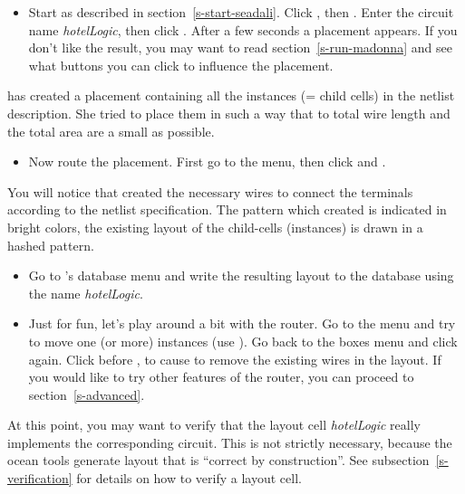\begin{itemize}
\item
Start  as described in section~\ref{s-start-seadali}.  Click
, then . 
Enter the circuit name {\sl
hotelLogic}, then click . After a few seconds a placement
appears. If you don't like the result, you may want to read
section~\ref{s-run-madonna} and see what buttons you can click to influence the
placement.
\end{itemize}
 has created a placement containing all the instances (= child
cells) 
in the netlist description. She tried to place them in such a way that
to total wire length and the total area are a small as possible.

\begin{itemize}
\item
Now route the placement. First go to the  menu, then click
and . 
\end{itemize}
You will notice that  created the necessary wires to connect the
terminals according to the netlist specification. The pattern which
 created is indicated in bright colors, the existing layout of the
child-cells (instances) is drawn in a hashed pattern.
\begin{itemize}
\item
Go to 's database menu and write the resulting
layout to the database using the name {\sl hotelLogic}.
\item
Just for fun, let's play around a bit with the router. 
Go to the  menu and try to move one (or more)
instances (use ). Go back to the boxes menu and click
 again. Click  before ,
to cause  to remove the existing wires in the layout.  If you would
like to try other features of the router, you can proceed to
section~\ref{s-advanced}.
\end{itemize}

At this point, you may want to verify that the layout cell {\sl hotelLogic}
really implements the corresponding circuit. This is not strictly
necessary, because the {\sc ocean} tools generate layout that is ``correct
by construction''. See subsection~\ref{s-verification} for details on how to
verify a layout cell.


